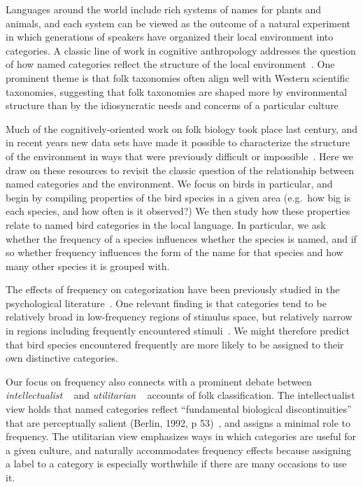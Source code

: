 \documentclass[10pt,letterpaper]{article}
\begin{document}
Languages around the world include rich systems of names for plants and animals, and each system can be viewed as the outcome of a natural experiment in which generations of speakers have organized their local environment into categories. A classic line of work in cognitive anthropology addresses the question of how named categories reflect the structure of the local environment~\cite{berlin2014ethnobiological,malt95}. One prominent theme is that folk taxonomies often align well with Western scientific taxonomies, suggesting that folk taxonomies are shaped more by environmental structure than by the idiosyncratic needs and concerns of a particular culture \cite{berlin2014ethnobiological}

Much of the cognitively-oriented work on folk biology took place last century, and in recent years new data sets have made it possible to characterize the structure of the environment in ways that were previously difficult or impossible~\cite{sullivan2009ebird,wilman2014eltontraits}. Here we draw on these resources to revisit the classic question of the relationship between named categories and the environment. We focus on birds in particular, and begin by compiling properties of the bird species in a given area (e.g.\ how big is each species, and how often is it observed?) We then study how these properties relate to named bird categories in the local language. In particular, we ask whether the frequency of a species influences whether the species is named, and if so whether frequency influences the form of the name for that species and how many other species it is grouped with. 

The effects of frequency on categorization have been previously studied in the psychological literature~\cite{parducci83,nosofsky88,barsalouhl98}.  One relevant finding is that categories tend to be relatively broad in low-frequency regions of stimulus space, but relatively narrow in regions including frequently encountered stimuli~\cite{parducci83}. We might therefore predict that bird species encountered frequently are more likely to be assigned to their own distinctive categories.  

Our focus on frequency also connects with a prominent debate between \emph{intellectualist} ~\cite{berlin2014ethnobiological} and \emph{utilitarian} ~\cite{hunn1982utilitarian} accounts of folk classification. The intellectualist view holds that named categories reflect ``fundamental biological discontinuities'' that are perceptually salient (Berlin, 1992, p 53)~\nocite{berlin2014ethnobiological}, and assigns a minimal role to frequency. The utilitarian view emphasizes ways in which categories are useful for a given culture, and naturally accommodates frequency effects because assigning a label to a category is especially worthwhile if there are many occasions to use it.
\end{document}
